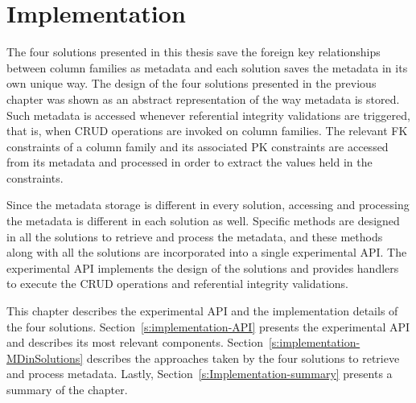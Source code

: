 \chapter{Implementation} \label{c:Implementation}

The four solutions presented in this thesis save the foreign key relationships
between column families as metadata and each solution saves the metadata in its
own unique way.  The design of the four solutions presented in the previous
chapter was shown as an  abstract representation of the way metadata is
stored.
Such metadata is accessed whenever referential integrity
validations are triggered, that is, when \ac{CRUD} operations are invoked on
column families. The relevant  \ac{FK} constraints of a column family and
its associated \ac{PK} constraints are accessed from its metadata and processed
in order to extract the values held in the constraints. 

Since the metadata storage is different in
every solution, accessing and processing the  metadata is different in each
solution as well. 
Specific methods are designed in all the solutions to retrieve and process the
metadata, and these methods along with all the
solutions are incorporated into a single experimental \ac{API}. The
experimental \ac{API} implements the design of the solutions and provides
handlers to execute the \ac{CRUD} operations and referential
integrity validations. 

This chapter describes  the experimental \ac{API} and
the implementation details of the  four solutions.
Section~\ref{s:implementation-API} presents the experimental \ac{API} and
describes its most relevant components.
Section~\ref{s:implementation-MDinSolutions} describes the approaches taken by
the four solutions to retrieve and process metadata.
Lastly, Section~\ref{s:Implementation-summary} presents a summary of the
chapter.
 


	


